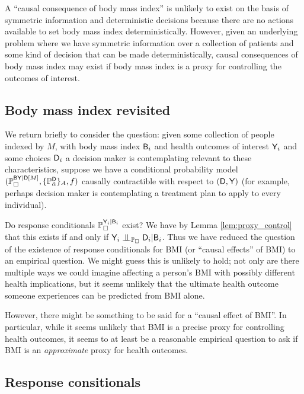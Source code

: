 A ``causal consequence of body mass index'' is unlikely to exist on the basis of symmetric information and deterministic decisions because there are no actions available to set body mass index deterministically. However, given an underlying problem where we have symmetric information over a collection of patients and some kind of decision that can be made deterministically, causal consequences of body mass index may exist if body mass index is a proxy for controlling the outcomes of interest.

\subsection{Body mass index revisited}

We return briefly to consider the question: given some collection of people indexed by $M$, with body mass index $\mathsf{B}_i$ and health outcomes of interest $\mathsf{Y}_i$ and some choices $\mathsf{D}_i$ a decision maker is contemplating relevant to these characteristics, suppose we have a conditional probability model $(\mathbb{P}_\square^{\mathsf{BY}|\mathsf{D}[M]},\{\mathbb{P}_{\tilde{\alpha}}^{\mathsf{D}}\}_A,f)$ causally contractible with respect to $(\mathsf{D},\mathsf{Y})$ (for example, perhaps decision maker is contemplating a treatment plan to apply to every individual).

Do response conditionals $\mathbb{P}_\square^{\mathsf{Y}_i|\mathsf{B}_i}$ exist? We have by Lemma \ref{lem:proxy_control} that this exists if and only if $\RV{Y}_i\CI_{\prob{P}_\square} \RV{D}_i|\RV{B}_i$. Thus we have reduced the question of the existence of response conditionals for BMI (or ``causal effects'' of BMI) to an empirical question. We might guess this is unlikely to hold; not only are there multiple ways we could imagine affecting a person's BMI with possibly different health implications, but it seems unlikely that the ultimate health outcome someone experiences can be predicted from BMI alone.

However, there might be something to be said for a ``causal effect of BMI''. In particular, while it seems unlikely that BMI is a precise proxy for controlling health outcomes, it seems to at least be a reasonable empirical question to ask if BMI is an \emph{approximate} proxy for health outcomes.


\subsection{Response consitionals}

